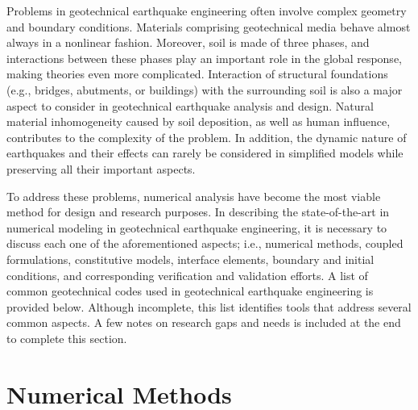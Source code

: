 Problems in geotechnical earthquake engineering often involve complex geometry and boundary conditions. Materials comprising geotechnical media behave almost always in a nonlinear fashion. Moreover, soil is made of three phases, and interactions between these phases play an important role in the global response, making theories even more complicated. Interaction of structural foundations (e.g., bridges, abutments, or buildings) with the surrounding soil is also a major aspect to consider in geotechnical earthquake analysis and design. Natural material inhomogeneity caused by soil deposition, as well as human influence, contributes to the complexity of the problem. In addition, the dynamic nature of earthquakes and their effects can rarely be considered in simplified models while preserving all their important aspects.

To address these problems, numerical analysis have become the most viable method for design and research purposes. In describing the state-of-the-art in numerical modeling in geotechnical earthquake engineering, it is necessary to discuss each one of the aforementioned aspects; i.e., numerical methods, coupled formulations, constitutive models, interface elements, boundary and initial conditions, and corresponding verification and validation efforts. A list of common geotechnical codes used in geotechnical earthquake engineering is provided below. Although incomplete, this list identifies tools that address several common aspects. A few notes on research gaps and needs is included at the end to complete this section. 

\section{Numerical Methods}
\label{sec:resp_geotech_1}

